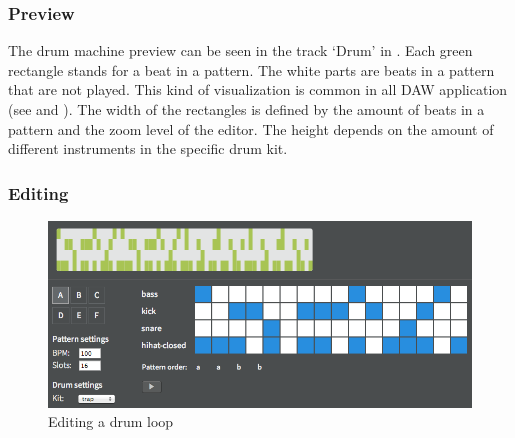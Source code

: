 \subsubsection{Preview}
\label{concept-drum-preview}

The drum machine preview can be seen in the track `Drum' in . Each green rectangle stands for a beat in a pattern. The white parts are beats in a pattern that are not played. This kind of visualization is common in all DAW application (see  and ). The width of the rectangles is defined by the amount of beats in a pattern and the zoom level of the editor. The height depends on the amount of different instruments in the specific drum kit.

\subsubsection{Editing}

\begin{figure}[htb]
  \centerline{\includegraphics[width=\linewidth]{images/drum-edit.png}}
  \caption[Editing a drum loop]{Editing a drum loop}
  \label{fig:editor-editing-a-loop}
\end{figure}

